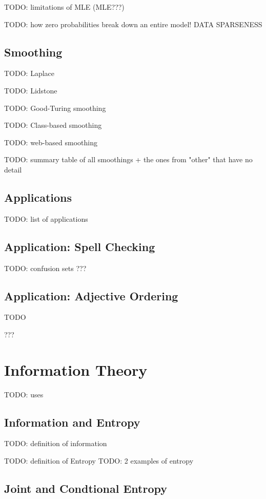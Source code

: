 \documentclass{article}
\begin{document}
TODO: limitations of MLE (MLE???)

TODO: how zero probabilities break down an entire model! DATA SPARSENESS

\subsection{Smoothing}

TODO: Laplace

TODO: Lidstone

TODO: Good-Turing smoothing

TODO: Class-based smoothing

TODO: web-based smoothing

TODO: summary table of all smoothings + the ones from "other" that have no detail

\subsection{Applications}

TODO: list of applications

\subsection{Application: Spell Checking}

TODO: confusion sets
???

\subsection{Application: Adjective Ordering}

TODO

???

\section{Information Theory}

TODO: uses

\subsection{Information and Entropy}

TODO: definition of information

TODO: definition of Entropy
TODO: 2 examples of entropy

\subsection{Joint and Condtional Entropy} 
\end{document}
